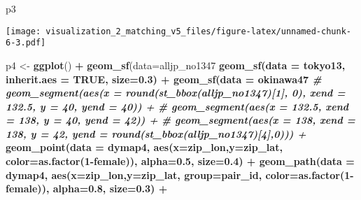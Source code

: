 \documentclass[
]{article}
\newenvironment{Shaded}{\begin{snugshade}}{\end{snugshade}}
\newcommand{\CommentTok}[1]{\textcolor[rgb]{0.56,0.35,0.01}{\textit{#1}}}
\newcommand{\DataTypeTok}[1]{\textcolor[rgb]{0.13,0.29,0.53}{#1}}
\newcommand{\DecValTok}[1]{\textcolor[rgb]{0.00,0.00,0.81}{#1}}
\newcommand{\FloatTok}[1]{\textcolor[rgb]{0.00,0.00,0.81}{#1}}
\newcommand{\KeywordTok}[1]{\textcolor[rgb]{0.13,0.29,0.53}{\textbf{#1}}}
\newcommand{\NormalTok}[1]{#1}
\newcommand{\OperatorTok}[1]{\textcolor[rgb]{0.81,0.36,0.00}{\textbf{#1}}}
\newcommand{\OtherTok}[1]{\textcolor[rgb]{0.56,0.35,0.01}{#1}}
\newcommand{\StringTok}[1]{\textcolor[rgb]{0.31,0.60,0.02}{#1}}
\begin{document}
\begin{Shaded}
\begin{Highlighting}[]
\NormalTok{p3}
\end{Highlighting}
\end{Shaded}

\texttt{[image: visualization\_2\_matching\_v5\_files/figure-latex/unnamed-chunk-6-3.pdf]}

\begin{Shaded}
\begin{Highlighting}[]
\NormalTok{p4 <-}\StringTok{ }\KeywordTok{ggplot}\NormalTok{() }\OperatorTok{+}\StringTok{ }
\StringTok{  }\KeywordTok{geom_sf}\NormalTok{(}\DataTypeTok{data=}\NormalTok{alljp_no1347 }\OperatorTok{%>%}\StringTok{ }\KeywordTok{st_simplify}\NormalTok{(}\DataTypeTok{dTolerance =} \FloatTok{0.01}\NormalTok{), }\DataTypeTok{size=}\FloatTok{0.3}\NormalTok{) }\OperatorTok{+}\StringTok{ }
\StringTok{  }\KeywordTok{geom_sf}\NormalTok{(}\DataTypeTok{data =}\NormalTok{ tokyo13, }\DataTypeTok{inherit.aes =} \OtherTok{TRUE}\NormalTok{, }\DataTypeTok{size=}\FloatTok{0.3}\NormalTok{) }\OperatorTok{+}\StringTok{ }
\StringTok{  }\KeywordTok{geom_sf}\NormalTok{(}\DataTypeTok{data =}\NormalTok{ okinawa47 }\OperatorTok{%>%}\StringTok{ }\KeywordTok{st_simplify}\NormalTok{(}\DataTypeTok{dTolerance =} \FloatTok{0.01}\NormalTok{), }\DataTypeTok{inherit.aes =} \OtherTok{TRUE}\NormalTok{, }\DataTypeTok{size=}\FloatTok{0.3}\NormalTok{) }\OperatorTok{+}\StringTok{   }
\StringTok{  }\CommentTok{# geom_segment(aes(x = round(st_bbox(alljp_no1347)[1], 0), xend = 132.5, y = 40, yend = 40)) + }
\StringTok{  }\CommentTok{# geom_segment(aes(x = 132.5, xend = 138, y = 40, yend = 42)) + }
\StringTok{  }\CommentTok{# geom_segment(aes(x = 138, xend = 138, y = 42, yend = round(st_bbox(alljp_no1347)[4],0))) + }
\StringTok{  }\KeywordTok{geom_point}\NormalTok{(}\DataTypeTok{data =}\NormalTok{ dymap4, }\KeywordTok{aes}\NormalTok{(}\DataTypeTok{x=}\NormalTok{zip_lon,}\DataTypeTok{y=}\NormalTok{zip_lat, }\DataTypeTok{color=}\KeywordTok{as.factor}\NormalTok{(}\DecValTok{1}\OperatorTok{-}\NormalTok{female)), }\DataTypeTok{alpha=}\FloatTok{0.5}\NormalTok{, }\DataTypeTok{size=}\FloatTok{0.4}\NormalTok{) }\OperatorTok{+}\StringTok{ }
\StringTok{  }\KeywordTok{geom_path}\NormalTok{(}\DataTypeTok{data =}\NormalTok{ dymap4, }\KeywordTok{aes}\NormalTok{(}\DataTypeTok{x=}\NormalTok{zip_lon,}\DataTypeTok{y=}\NormalTok{zip_lat, }\DataTypeTok{group=}\NormalTok{pair_id, }\DataTypeTok{color=}\KeywordTok{as.factor}\NormalTok{(}\DecValTok{1}\OperatorTok{-}\NormalTok{female)), }\DataTypeTok{alpha=}\FloatTok{0.8}\NormalTok{, }\DataTypeTok{size=}\FloatTok{0.3}\NormalTok{) }\OperatorTok{+}\StringTok{ }
}}
\end{Highlighting}
\end{Shaded}
\end{document}
